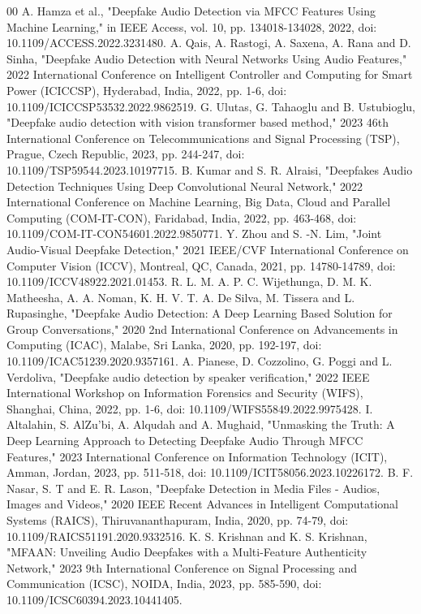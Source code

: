 \documentclass[conference]{IEEEtran}
\begin{document}
\begin{thebibliography}{00}
 A. Hamza et al., "Deepfake Audio Detection via MFCC Features Using Machine Learning," in IEEE Access, vol. 10, pp. 134018-134028, 2022, doi: 10.1109/ACCESS.2022.3231480. 
 A. Qais, A. Rastogi, A. Saxena, A. Rana and D. Sinha, "Deepfake Audio Detection with Neural Networks Using Audio Features," 2022 International Conference on Intelligent Controller and Computing for Smart Power (ICICCSP), Hyderabad, India, 2022, pp. 1-6, doi: 10.1109/ICICCSP53532.2022.9862519. 
 G. Ulutas, G. Tahaoglu and B. Ustubioglu, "Deepfake audio detection with vision transformer based method," 2023 46th International Conference on Telecommunications and Signal Processing (TSP), Prague, Czech Republic, 2023, pp. 244-247, doi: 
10.1109/TSP59544.2023.10197715.   
 B. Kumar and S. R. Alraisi, "Deepfakes Audio Detection Techniques Using Deep Convolutional Neural Network," 2022 International Conference on Machine Learning, Big Data, Cloud and Parallel Computing (COM-IT-CON), Faridabad, India, 2022, pp. 463-468, doi: 10.1109/COM-IT-CON54601.2022.9850771.
 Y. Zhou and S. -N. Lim, "Joint Audio-Visual Deepfake Detection," 2021 IEEE/CVF International Conference on Computer Vision (ICCV), Montreal, QC, Canada, 2021, pp. 14780-14789, doi: 10.1109/ICCV48922.2021.01453.
 R. L. M. A. P. C. Wijethunga, D. M. K. Matheesha, A. A. Noman, K. H. V. T. A. De Silva, M. Tissera and L. Rupasinghe, "Deepfake Audio Detection: A Deep Learning Based Solution for Group Conversations," 2020 2nd International Conference on Advancements in Computing (ICAC), Malabe, Sri Lanka, 2020, pp. 192-197, doi: 10.1109/ICAC51239.2020.9357161.
 A. Pianese, D. Cozzolino, G. Poggi and L. Verdoliva, "Deepfake audio detection by speaker verification," 2022 IEEE International Workshop on Information Forensics and Security (WIFS), Shanghai, China, 2022, pp. 1-6, doi: 10.1109/WIFS55849.2022.9975428.
 I. Altalahin, S. AlZu'bi, A. Alqudah and A. Mughaid, "Unmasking the Truth: A Deep Learning Approach to Detecting Deepfake Audio Through MFCC Features," 2023 International Conference on Information Technology (ICIT), Amman, Jordan, 2023, pp. 511-518, doi: 10.1109/ICIT58056.2023.10226172.
 B. F. Nasar, S. T and E. R. Lason, "Deepfake Detection in Media Files - Audios, Images and Videos," 2020 IEEE Recent Advances in Intelligent Computational Systems (RAICS), Thiruvananthapuram, India, 2020, pp. 74-79, doi: 10.1109/RAICS51191.2020.9332516.
 K. S. Krishnan and K. S. Krishnan, "MFAAN: Unveiling Audio Deepfakes with a Multi-Feature Authenticity Network," 2023 9th International Conference on Signal Processing and Communication (ICSC), NOIDA, India, 2023, pp. 585-590, doi: 10.1109/ICSC60394.2023.10441405.

\end{thebibliography}
\end{document}
